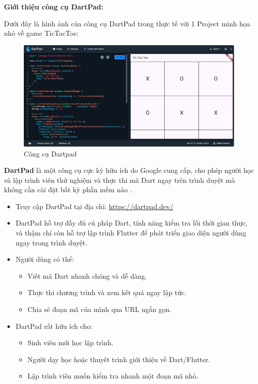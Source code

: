 \documentclass[../DoAn.tex]{subfiles}
\numberwithin{figure}{chapter}
\begin{document}
\textbf{Giới thiệu công cụ DartPad:} 

Dưới đây là hình ảnh của công cụ DartPad trong thực tế với 1 Project minh họa nhỏ về game TicTacToe:

\begin{figure}[H]
    \centering
    \includegraphics[width=1\textwidth]{Hinhve/dartpad.png}
    \caption{Công cụ Dartpad}
    \label{fig:dartimg}
\end{figure}


\textbf{DartPad} là một công cụ cực kỳ hữu ích do Google cung cấp, cho phép người học và lập trình viên thử nghiệm và thực thi mã Dart ngay trên trình duyệt mà không cần cài đặt bất kỳ phần mềm nào .

\begin{itemize}
    \item Truy cập DartPad tại địa chỉ: \url{https://dartpad.dev/}
    \item DartPad hỗ trợ đầy đủ cú pháp Dart, tính năng kiểm tra lỗi thời gian thực, và thậm chí còn hỗ trợ lập trình Flutter để phát triển giao diện người dùng ngay trong trình duyệt.
    \item Người dùng có thể:
    \begin{itemize}
        \item Viết mã Dart nhanh chóng và dễ dàng.
        \item Thực thi chương trình và xem kết quả ngay lập tức.
        \item Chia sẻ đoạn mã của mình qua URL ngắn gọn.
    \end{itemize}
    \item DartPad rất hữu ích cho:
    \begin{itemize}
        \item Sinh viên mới học lập trình.
        \item Người dạy học hoặc thuyết trình giới thiệu về Dart/Flutter.
        \item Lập trình viên muốn kiểm tra nhanh một đoạn mã nhỏ.
    \end{itemize}
\end{itemize}
\end{document}
